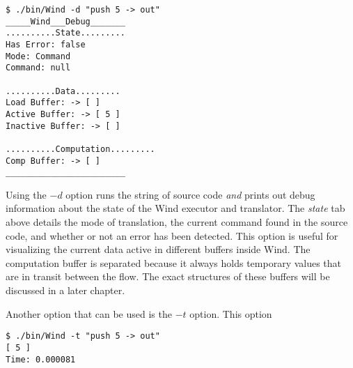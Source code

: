 \begin{verbatim}
$ ./bin/Wind -d "push 5 -> out"
_____Wind___Debug_______
..........State.........
Has Error: false
Mode: Command
Command: null

..........Data.........
Load Buffer: -> [ ]
Active Buffer: -> [ 5 ]
Inactive Buffer: -> [ ]

..........Computation.........
Comp Buffer: -> [ ]
________________________
\end{verbatim}

\par Using the $-d$ option runs the string of source code \emph{and} prints out debug information about the state of the Wind executor and translator. The \emph{state} tab above details the mode of translation, the current command found in the source code, and whether or not an error has been detected. This option is useful for visualizing the current data active in different buffers inside Wind. The computation buffer is separated because it always holds temporary values that are in transit between the flow. The exact structures of these buffers will be discussed in a later chapter.
\par Another option that can be used is the $-t$ option. This option

\begin{verbatim}
$ ./bin/Wind -t "push 5 -> out"
[ 5 ]
Time: 0.000081
\end{verbatim}




